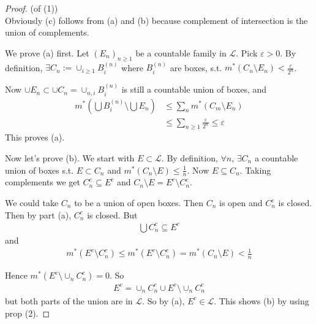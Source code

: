 \documentclass[a4paper]{article}
\begin{document}
\begin{proof} (of (1))\\
Obviously (c) follows from (a) and (b) because complement of intersection is the union of complements.

We prove (a) first. Let $(E_n)_{n \geq 1}$ be a countable family in $\mathcal{L}$. Pick $\varepsilon>0$. By definition, $\exists C_n:=\cup_{i \geq 1} B^{(n)}_i$ where $B^{(n)}_i$ are boxes, s.t. $m^*(C_n \setminus E_n) < \frac{\varepsilon}{2^n}$.

Now $\cup E_n \subset \cup C_n = \cup_{n,i} B^{(n)}_i$ is still a countable union of boxes, and
\begin{equation*}
\begin{aligned}
m^*(\bigcup B^{(n)}_i \setminus \bigcup E_n) &\leq \sum_n m^*(C_m \setminus E_n)\\
&\leq \sum_{n \geq 1} \frac{\varepsilon}{2^n} \leq \varepsilon
\end{aligned}
\end{equation*}
This proves (a).

Now let's prove (b). We start with $E \subset \mathcal{L}$. By definition, $\forall n$, $\exists C_n$ a countable union of boxes s.t. $E \subset C_n$ and $m^*(C_n \setminus E) \leq \frac{1}{n}$. Now $E \subseteq C_n$. Taking complements we get $C_n^c \subseteq E^c$ and $C_n \setminus E = E^c \setminus C_n^c$.

We could take $C_n$ to be a union of open boxes. Then $C_n$ is open and $C_n^c$ is closed. Then by part (a), $C_n^c$ is closed. But
\begin{equation*}
\begin{aligned}
\bigcup C_n^c \subseteq E^c
\end{aligned}
\end{equation*}
and 
\begin{equation*}
\begin{aligned}
m^*(E^c \setminus C_n^c) \leq m^*(E^c \setminus C_n^c) = m^* (C_n \setminus E) < \frac{1}{n}
\end{aligned}
\end{equation*}

Hence $m^*(E^c \setminus \cup_n C_n^c) = 0$. So
\begin{equation*}
\begin{aligned}
E^c = \cup_n C_n^c \cup E^c \setminus \cup_n C_n^c
\end{aligned}
\end{equation*}
but both parts of the union are in $\mathcal{L}$. So by (a), $E^c \in \mathcal{L}$. This shows (b) by using prop (2).
\end{proof}
\end{document}
